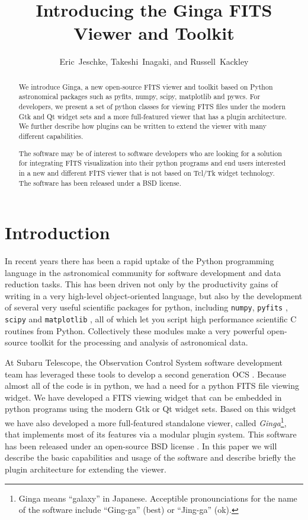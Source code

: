 \documentclass[11pt,twoside]{article}
\begin{document}
\title{Introducing the Ginga FITS Viewer and Toolkit}
\author{Eric~Jeschke, Takeshi~Inagaki, and Russell~Kackley}

\begin{abstract}
We introduce Ginga, a new open-source FITS
viewer and toolkit based on Python astronomical packages such as pyfits,
numpy, scipy, matplotlib and pywcs.  For developers, we present a set of
python classes for viewing FITS files under the modern Gtk and Qt widget
sets and a more  full-featured viewer that has a plugin architecture.
We further describe how plugins can be written to extend the viewer with
many different capabilities.  

The software may be of interest to software developers who are
looking for a solution for integrating FITS visualization into their
python programs and end users interested in a new and different FITS
viewer that is not based on Tcl/Tk widget technology.  The software has
been released under a BSD license.
\end{abstract}

\section{Introduction}
In recent years there has been a rapid uptake of the Python
programming language in the astronomical community for software
development and data reduction tasks.
This has been driven not only by the productivity gains of writing in a
very high-level object-oriented language, but also by the development of
several very useful scientific packages for python, including 
{\tt numpy}, {\tt pyfits} \citep{Barrett99}, {\tt scipy} and 
{\tt matplotlib} \citep{matplotlib}, all of which let you script high
performance scientific C routines from Python. 
Collectively these modules make a very powerful open-source toolkit for the
processing and analysis of astronomical data.

At Subaru Telescope, the Observation Control System software development
team has leveraged these tools to develop a second generation
OCS \citep{Jeschke10B}.  
Because almost all of the code is in python, we had a need for a python
FITS file viewing widget.  We have developed a FITS viewing widget that
can be embedded in python programs using the modern Gtk or Qt widget
sets.
Based on this widget we have also developed a more full-featured
standalone viewer, called \emph{Ginga}\footnote{Ginga means ``galaxy''
  in Japanese. Acceptible pronounciations for the name of the software
  include ``Ging-ga'' (best) or ``Jing-ga'' (ok).}, 
that implements most of its features via a modular plugin system.
This software has been released under an open-source BSD
license \citep{Jeschke12}.
In this paper we will describe the basic capabilities and usage of the
software and describe briefly the plugin architecture for extending the
viewer.
\end{document}
